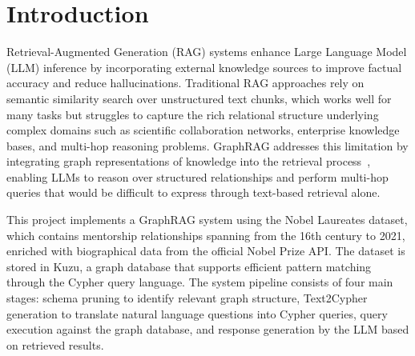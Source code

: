\documentclass[sigconf]{acmart}
\begin{document}



\maketitle

\section{Introduction}

Retrieval-Augmented Generation (RAG) systems enhance Large Language Model (LLM) inference by incorporating external knowledge sources to improve factual accuracy and reduce hallucinations. Traditional RAG approaches rely on semantic similarity search over unstructured text chunks, which works well for many tasks but struggles to capture the rich relational structure underlying complex domains such as scientific collaboration networks, enterprise knowledge bases, and multi-hop reasoning problems. GraphRAG addresses this limitation by integrating graph representations of knowledge into the retrieval process~\cite{han2025retrievalaugmentedgenerationgraphsgraphrag}, enabling LLMs to reason over structured relationships and perform multi-hop queries that would be difficult to express through text-based retrieval alone.

This project implements a GraphRAG system using the Nobel Laureates dataset, which contains mentorship relationships spanning from the 16th century to 2021, enriched with biographical data from the official Nobel Prize API. The dataset is stored in Kuzu, a graph database that supports efficient pattern matching through the Cypher query language. The system pipeline consists of four main stages: schema pruning to identify relevant graph structure, Text2Cypher generation to translate natural language questions into Cypher queries, query execution against the graph database, and response generation by the LLM based on retrieved results.
\end{document}
